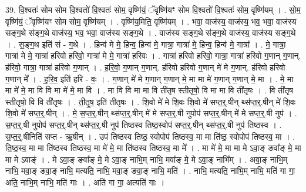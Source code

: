 \documentclass[17pt]{extarticle}
\begin{document}
39. वि॒श्वतः॑ सोम सोम वि॒श्वतो॑ वि॒श्वतः॑ सोम॒ वृष्णि॑यं॒ ॅवृष्णि॑यꣳ सोम वि॒श्वतो॑ वि॒श्वतः॑ सोम॒ वृष्णि॑यम् । . सो॒म॒ वृष्णि॑यं॒ ॅवृष्णि॑यꣳ सोम सोम॒ वृष्णि॑यम् । . वृष्णि॑य॒मिति॒ वृष्णि॑यम् । . भवा॒ वाज॑स्य॒ वाज॑स्य॒ भव॒ भवा॒ वाज॑स्य सङ्ग॒थे स॑ङ्ग॒थे वाज॑स्य॒ भव॒ भवा॒ वाज॑स्य सङ्ग॒थे । . वाज॑स्य सङ्ग॒थे स॑ङ्ग॒थे वाज॑स्य॒ वाज॑स्य सङ्ग॒थे । . स॒ङ्ग॒थ इति॑ सं - ग॒थे । . हिन्व॑ मे मे॒ हिन्व॒ हिन्व॑ मे॒ गात्रा॒ गात्रा॑ मे॒ हिन्व॒ हिन्व॑ मे॒ गात्रा᳚ । . मे॒ गात्रा॒ गात्रा॑ मे मे॒ गात्रा॑ हरिवो हरिवो॒ गात्रा॑ मे मे॒ गात्रा॑ हरिवः । . गात्रा॑ हरिवो हरिवो॒ गात्रा॒ गात्रा॑ हरिवो ग॒णान् ग॒णान्. ह॑रिवो॒ गात्रा॒ गात्रा॑ हरिवो ग॒णान् । . ह॒रि॒वो॒ ग॒णान् ग॒णान्. ह॑रिवो हरिवो ग॒णान् मे॑ मे ग॒णान्. ह॑रिवो हरिवो ग॒णान् मे᳚ । . ह॒रि॒व॒ इति॑ हरि - वः॒ । . ग॒णान् मे॑ मे ग॒णान् ग॒णान् मे॒ मा मा मे॑ ग॒णान् ग॒णान् मे॒ मा । . मे॒ मा मा मे॑ मे॒ मा वि वि मा मे॑ मे॒ मा वि । . मा वि वि मा मा वि ती॑तृष स्तीतृषो॒ वि मा मा वि ती॑तृषः । . वि ती॑तृष स्तीतृषो॒ वि वि ती॑तृषः । . ती॒तृ॒ष॒ इति॑ तीतृषः । . शि॒वो मे॑ मे शि॒वः शि॒वो मे॑ सप्त॒र्॒.षीन् थ्स॑प्त॒र्॒.षीन् मे॑ शि॒वः शि॒वो मे॑ सप्त॒र्॒.षीन् । . मे॒ स॒प्त॒र्॒.षीन् थ्स॑प्त॒र्॒.षीन् मे॑ मे सप्त॒र्॒.षी नुपोप॑ सप्त॒र्॒.षीन् मे॑ मे सप्त॒र्॒.षी नुप॑ । . स॒प्त॒र्॒.षी नुपोप॑ सप्त॒र्॒.षीन् थ्स॑प्त॒र्॒.षी नुप॑ तिष्ठस्व तिष्ठ॒स्वोप॑ सप्त॒र्॒.षीन् थ्स॑प्त॒र्॒.षी नुप॑ तिष्ठस्व । . स॒प्त॒र्॒.षीनिति॑ सप्त - ऋ॒षीन् । . उप॑ तिष्ठस्व तिष्ठ॒ स्वोपोप॑ तिष्ठस्व॒ मा मा ति॑ष्ठ॒ स्वोपोप॑ तिष्ठस्व॒ मा । . ति॒ष्ठ॒स्व॒ मा मा ति॑ष्ठस्व तिष्ठस्व॒ मा मे॑ मे॒ मा ति॑ष्ठस्व तिष्ठस्व॒ मा मे᳚ । . मा मे॑ मे॒ मा मा मे ऽवा॒ङ् ङवा᳚ङ् मे॒ मा मा मे ऽवाङ्॑ । . मे ऽवा॒ङ् ङवा᳚ङ् मे॒ मे ऽवा॒ङ् नाभि॒म् नाभि॒ मवा᳚ङ् मे॒ मे ऽवा॒ङ् नाभि᳚म् । . अवा॒ङ् नाभि॒म् नाभि॒ मवा॒ङ् ङवा॒ङ् नाभि॒ मत्यति॒ नाभि॒ मवा॒ङ् ङवा॒ङ् नाभि॒ मति॑ । . नाभि॒ मत्यति॒ नाभि॒म् नाभि॒ मति॑ गा गा॒ अति॒ नाभि॒म् नाभि॒ मति॑ गाः । . अति॑ गा गा॒ अत्यति॑ गाः । \newline
\pagebreak
{}
\end{document}
